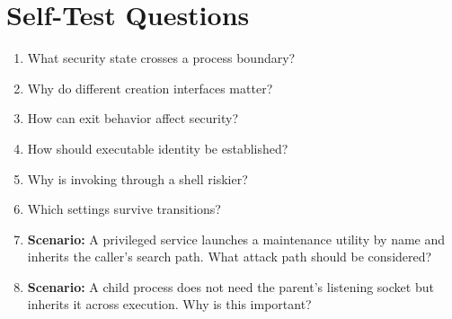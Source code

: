 \documentclass[11pt,letterpaper]{article}
\begin{document}
\section{Self-Test Questions}
\begin{enumerate}
\item What security state crosses a process boundary?
\item Why do different creation interfaces matter?
\item How can exit behavior affect security?
\item How should executable identity be established?
\item Why is invoking through a shell riskier?
\item Which settings survive transitions?
\item \textbf{Scenario:} A privileged service launches a maintenance utility by name and inherits the caller's search path. What attack path should be considered?
\item \textbf{Scenario:} A child process does not need the parent's listening socket but inherits it across execution. Why is this important?
\end{enumerate}
\clearpage
\end{document}
